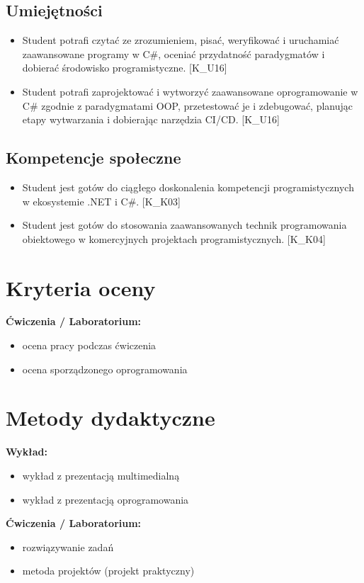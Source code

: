 \documentclass[12pt, a4paper]{article}
\begin{document}
\subsection*{Umiejętności}
\begin{itemize}
  \item Student potrafi czytać ze zrozumieniem, pisać, weryfikować i uruchamiać zaawansowane programy w C\#, oceniać przydatność paradygmatów i dobierać środowisko programistyczne. [K\_U16]
  \item Student potrafi zaprojektować i wytworzyć zaawansowane oprogramowanie w C\# zgodnie z paradygmatami OOP, przetestować je i zdebugować, planując etapy wytwarzania i dobierając narzędzia CI/CD. [K\_U16]
\end{itemize}

\subsection*{Kompetencje społeczne}
\begin{itemize}
  \item Student jest gotów do ciągłego doskonalenia kompetencji programistycznych w ekosystemie .NET i C\#. [K\_K03]
  \item Student jest gotów do stosowania zaawansowanych technik programowania obiektowego w komercyjnych projektach programistycznych. [K\_K04]
\end{itemize}

\section{Kryteria oceny}

\textbf{Ćwiczenia / Laboratorium:}
\begin{itemize}
  \item ocena pracy podczas ćwiczenia
  \item ocena sporządzonego oprogramowania
\end{itemize}


\section{Metody dydaktyczne}

\textbf{Wykład:}
\begin{itemize}
  \item wykład z prezentacją multimedialną
  \item wykład z prezentacją oprogramowania
\end{itemize}
\vspace{4pt}
\textbf{Ćwiczenia / Laboratorium:}
\begin{itemize}
  \item rozwiązywanie zadań
  \item metoda projektów (projekt praktyczny)
\end{itemize}
\vspace{4pt}
\end{document}
